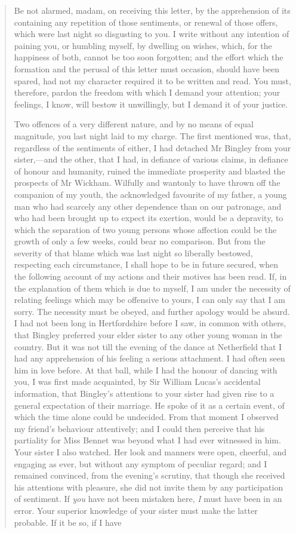 \begin{quotation}
Be not alarmed, madam, on receiving this letter, by the apprehension of its containing any repetition of those sentiments, or renewal of those offers, which were last night so disgusting to you. I write without any intention of paining you, or humbling myself, by dwelling on wishes, which, for the happiness of both, cannot be too soon forgotten; and the effort which the formation and the perusal of this letter must occasion, should have been spared, had not my character required it to be written and read. You must, therefore, pardon the freedom with which I demand your attention; your feelings, I know, will bestow it unwillingly, but I demand it of your justice.

Two offences of a very different nature, and by no means of equal magnitude, you last night laid to my charge. The first mentioned was, that, regardless of the sentiments of either, I had detached Mr Bingley from your sister,—and the other, that I had, in defiance of various claims, in defiance of honour and humanity, ruined the immediate prosperity and blasted the prospects of Mr Wickham. Wilfully and wantonly to have thrown off the companion of my youth, the acknowledged favourite of my father, a young man who had scarcely any other dependence than on our patronage, and who had been brought up to expect its exertion, would be a depravity, to which the separation of two young persons whose affection could be the growth of only a few weeks, could bear no comparison. But from the severity of that blame which was last night so liberally bestowed, respecting each circumstance, I shall hope to be in future secured, when the following account of my actions and their motives has been read. If, in the explanation of them which is due to myself, I am under the necessity of relating feelings which may be offensive to yours, I can only say that I am sorry. The necessity must be obeyed, and further apology would be absurd. I had not been long in Hertfordshire before I saw, in common with others, that Bingley preferred your elder sister to any other young woman in the country. But it was not till the evening of the dance at Netherfield that I had any apprehension of his feeling a serious attachment. I had often seen him in love before. At that ball, while I had the honour of dancing with you, I was first made acquainted, by Sir William Lucas's accidental information, that Bingley's attentions to your sister had given rise to a general expectation of their marriage. He spoke of it as a certain event, of which the time alone could be undecided. From that moment I observed my friend's behaviour attentively; and I could then perceive that his partiality for Miss Bennet was beyond what I had ever witnessed in him. Your sister I also watched. Her look and manners were open, cheerful, and engaging as ever, but without any symptom of peculiar regard; and I remained convinced, from the evening's scrutiny, that though she received his attentions with pleasure, she did not invite them by any participation of sentiment. If \textit{you} have not been mistaken here, \textit{I} must have been in an error. Your superior knowledge of your sister must make the latter probable. If it be so, if I have 
\end{quotation}
